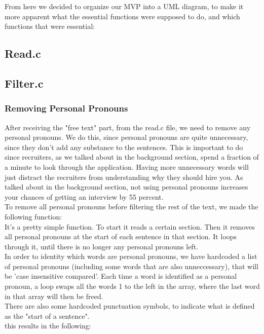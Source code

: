From here we decided to organize our MVP into a UML diagram, to make it more apparent
what the essential functions were supposed to do, and which functions that were essential:

\subsection{Read.c}
\subsection{Filter.c}


\subsubsection{Removing Personal Pronouns}
After receiving the "free text" part, from the read.c file, we need to remove any personal pronouns.
We do this, since personal pronouns are quite unnecessary, since they don't add any substance to the sentences.
This is important to do since recruiters, as we talked about in the background section, spend a fraction of a minute
to look through the application. 
Having more unnecessary words will just distract the recruiters from understanding why they should hire you.
As talked about in the background section, not using personal pronouns increases your
chances of getting an interview by 55 percent.
\\
To remove all personal pronouns before filtering the rest of the text, we made the following function:
\\
It's a pretty simple function. To start it reads a certain section. Then it removes all personal pronouns at the start of each sentence in that section.
It loops through it, until there is no longer any personal pronouns left.
\\
In order to identity which words are personal pronouns, we have hardcoded a list of personal pronouns\cite{english_personal_pronouns} (including some words that are also unneccessary), that will be 'case insensitive compared'.
Each time a word is identified as a personal pronoun, a loop swaps all the words 1 to the left in the array, where the last word in that array will then be freed.
\\
There are also some hardcoded punctuation symbols, to indicate what is defined as the "start of a sentence". 
\\
this results in the following:

